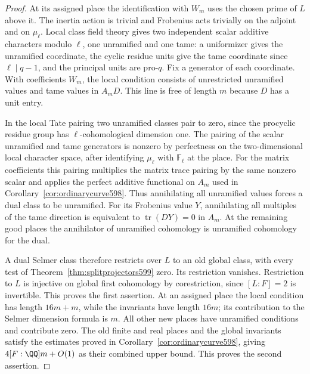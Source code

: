 \documentclass[a4paper,11pt]{article}
\theoremstyle{definition}
\theoremstyle{remark}
\numberwithin{equation}{section}
\begin{document}
\begin{proof}
At its assigned place the identification with \(W_m\)
uses the chosen prime of \(L\) above it. The inertia
action is trivial and Frobenius acts trivially on the
adjoint and on \(\mu_\ell\). Local class field theory
gives two independent scalar additive characters modulo
\(\ell\), one unramified and one tame: a uniformizer
gives the unramified coordinate, the cyclic residue
units give the tame coordinate since \(\ell\mid q-1\),
and the principal units are pro-\(q\). Fix a generator
of each coordinate. With coefficients \(W_m\), the
local condition consists of unrestricted unramified
values and tame values in \(A_mD\). This line is free
of length \(m\) because \(D\) has a unit entry.

In the local Tate pairing two unramified classes pair
to zero, since the procyclic residue group has
\(\ell\)-cohomological dimension one. The pairing of
the scalar unramified and tame generators is nonzero
by perfectness on the two-dimensional local character
space, after identifying \(\mu_\ell\) with
\(\mathbb F_\ell\) at the place. For the matrix
coefficients this pairing multiplies the matrix trace
pairing by the same nonzero scalar and applies the
perfect additive functional on \(A_m\) used in
Corollary~\ref{cor:ordinarycurve598}. Thus annihilating
all unramified values forces a dual class to be
unramified. For its Frobenius value \(Y\), annihilating
all multiples of the tame direction is equivalent to
\(\operatorname{tr}(DY)=0\) in \(A_m\). At the remaining
good places the annihilator of unramified cohomology is
unramified cohomology for the dual. \cite{XII-IX-V-milne98}

A dual Selmer class therefore restricts over \(L\) to
an old global class, with every test of
Theorem~\ref{thm:splitprojectors599} zero. Its restriction
vanishes. Restriction to \(L\) is injective on global
first cohomology by corestriction, since \([L:F]=2\)
is invertible. This proves the first assertion. At
an assigned place the local condition has length
\(16m+m\), while the invariants have length \(16m\);
its contribution to the Selmer dimension formula is
\(m\). All other new places have unramified conditions
and contribute zero. The old finite and real places
and the global invariants satisfy the estimates proved
in Corollary~\ref{cor:ordinarycurve598}, giving
\(4[F:\QQ]m+O(1)\) as their combined upper bound.
This proves the second assertion.
\end{proof}
\end{document}
